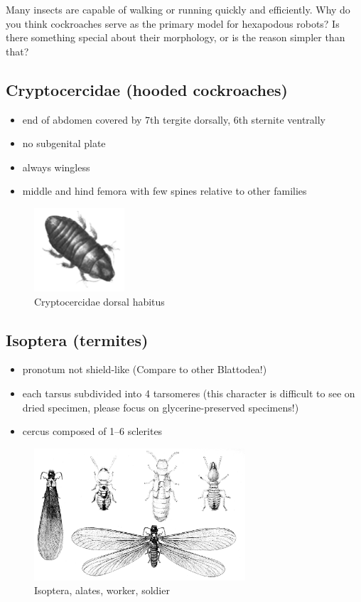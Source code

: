 \documentclass[letterpaper, 11pt]{article}
\begin{document}
\noindent{}Many insects are capable of walking or running quickly and efficiently. Why do you think cockroaches serve as the primary model for hexapodous robots? Is there something special about their morphology, or is the reason simpler than that?\vspace{4cm}

\subsection{Cryptocercidae (hooded cockroaches)}
\begin{itemize}
\item end of abdomen covered by 7th tergite dorsally, 6th sternite ventrally
\item no subgenital plate
\item always wingless
\item middle and hind femora with few spines relative to other families
\end{itemize}

\begin{figure}[ht!]
  \centering
    \includegraphics[width=0.3\textwidth]{CryptocercidHabitus}
  \caption{Cryptocercidae dorsal habitus \citep[][Plate VI, Fig. 20]{bhl18655}}
  \label{fig:cryptocercid}
\end{figure}

\subsection{Isoptera (termites)}
\begin{itemize}
\item pronotum not shield-like (Compare to other Blattodea!)
\item each tarsus subdivided into 4 tarsomeres (this character is difficult to see on dried specimen, please focus on glycerine-preserved specimens!)
\item cercus composed of 1--6 sclerites
\end{itemize}

\begin{figure}[ht!]
  \centering
    \includegraphics[width=0.7\textwidth]{Isoptera}
  \caption{Isoptera, alates, worker, soldier \citep[][Plate II]{bhl82061}}
  \label{fig:termite}
\end{figure}
\end{document}
